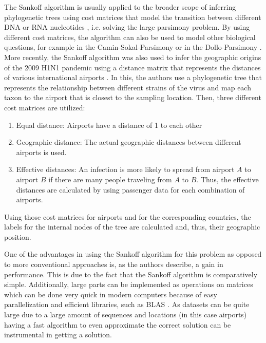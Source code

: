 \documentclass{article}
\begin{document}
The Sankoff algorithm is usually applied to the broader scope of
inferring phylogenetic trees using cost matrices that model the transition
between different DNA or RNA nucleotides
\cite{jonesIntroductionBioinformaticsAlgorithms2004}, i.e. solving the large parsimony problem. By
using different cost
matrices, the algorithm can also be used to model other biological questions,
for example in the Camin-Sokal-Parsimony \cite{caminMethodDeducingBranching1965}
or in the Dollo-Parsimony \cite{farrisPhylogeneticAnalysisDollo2022}. More
recently, the Sankoff algorithm was also used to infer the geographic origins of
the 2009 H1N1 pandemic using a distance matrix that represents the distances of
various international airports
\cite{reimeringPhylogeographicReconstructionUsing2020}. In this, the authors use
a phylogenetic tree that represents the relationship between different strains
of the virus and map each taxon to the airport that is closest to the sampling
location. Then, three different cost matrices are utilized:

\begin{enumerate}
  \item Equal distance: Airports have a distance of 1 to each other
  \item Geographic distance: The actual geographic distances between different
  airports is used.
  \item Effective distances: An infection is more likely to spread from
  airport $A$ to airport $B$ if there are many people traveling from $A$ to
  $B$. Thus, the effective distances are calculated by using passenger data
  for each combination of airports.
\end{enumerate}

Using those cost matrices for airports and for the corresponding countries, the
labels for the internal nodes of the tree are calculated and, thus, their
geographic position.

One of the advantages in using the Sankoff algorithm for this problem as opposed to more
conventional approaches is, as the authors describe, a gain in performance. This is due to the fact
that the Sankoff algorithm is comparatively simple. Additionally, large parts can be implemented as
operations on matrices which can be done very quick in modern computers because of easy
parallelization and efficient libraries, such as BLAS \cite{lawsonBasicLinearAlgebra1979}. As
datasets can be quite large due to a large
amount of sequences and locations (in this case airports) having a fast
algorithm to even approximate the correct solution can be instrumental in getting a solution.
\end{document}
